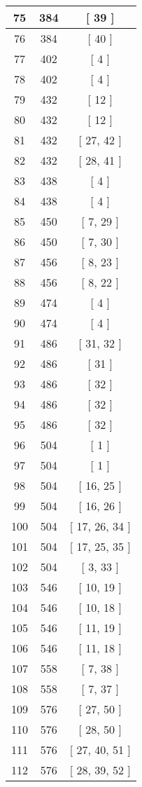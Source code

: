 \begin{center}
\begin{longtable}[H]{|| c c c ||}
75 & 384 & [ 39 ]
\\\hline
76 & 384 & [ 40 ]
\\\hline
77 & 402 & [ 4 ]
\\\hline
78 & 402 & [ 4 ]
\\\hline
79 & 432 & [ 12 ]
\\\hline
80 & 432 & [ 12 ]
\\\hline
81 & 432 & [ 27, 42 ]
\\\hline
82 & 432 & [ 28, 41 ]
\\\hline
83 & 438 & [ 4 ]
\\\hline
84 & 438 & [ 4 ]
\\\hline
85 & 450 & [ 7, 29 ]
\\\hline
86 & 450 & [ 7, 30 ]
\\\hline
87 & 456 & [ 8, 23 ]
\\\hline
88 & 456 & [ 8, 22 ]
\\\hline
89 & 474 & [ 4 ]
\\\hline
90 & 474 & [ 4 ]
\\\hline
91 & 486 & [ 31, 32 ]
\\\hline
92 & 486 & [ 31 ]
\\\hline
93 & 486 & [ 32 ]
\\\hline
94 & 486 & [ 32 ]
\\\hline
95 & 486 & [ 32 ]
\\\hline
96 & 504 & [ 1 ]
\\\hline
97 & 504 & [ 1 ]
\\\hline
98 & 504 & [ 16, 25 ]
\\\hline
99 & 504 & [ 16, 26 ]
\\\hline
100 & 504 & [ 17, 26, 34 ]
\\\hline
101 & 504 & [ 17, 25, 35 ]
\\\hline
102 & 504 & [ 3, 33 ]
\\\hline
103 & 546 & [ 10, 19 ]
\\\hline
104 & 546 & [ 10, 18 ]
\\\hline
105 & 546 & [ 11, 19 ]
\\\hline
106 & 546 & [ 11, 18 ]
\\\hline
107 & 558 & [ 7, 38 ]
\\\hline
108 & 558 & [ 7, 37 ]
\\\hline
109 & 576 & [ 27, 50 ]
\\\hline
110 & 576 & [ 28, 50 ]
\\\hline
111 & 576 & [ 27, 40, 51 ]
\\\hline
112 & 576 & [ 28, 39, 52 ]
\\\hline

\end{longtable}
\end{center}
